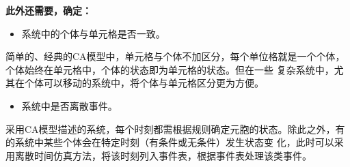 \documentclass[UTF8]{ctexart}
\begin{document}
    \vspace{0.5cm}
    \textbf{此外还需要，确定：}
    \begin{itemize}
        \item 系统中的个体与单元格是否一致。
    \end{itemize}
    简单的、经典的CA模型中，单元格与个体不加区分，每个单位格就是一个个体，个体始终在单元格中，个体的状态即为单元格的状态。但在一些
    复杂系统中，尤其在个体可以移动的系统中，将个体与单元格区分更为方便。

    \begin{itemize}
        \item 系统中是否离散事件。
    \end{itemize}
    采用CA模型描述的系统，每个时刻都需根据规则确定元胞的状态。除此之外，有的系统中某些个体会在特定时刻（有条件或无条件）发生状态变
    化，此时可以采用离散时间仿真方法，将该时刻列入事件表，根据事件表处理该类事件。
    
\end{document}
